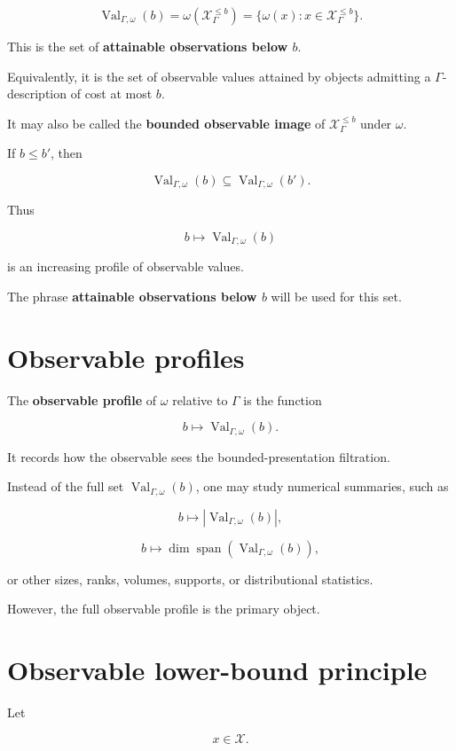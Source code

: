 \documentclass[11pt]{article}
\begin{document}
\[
\operatorname{Val}_{\Gamma,\omega}(b)=\omega(\mathcal X_\Gamma^{\leq b})=\{\omega(x):x\in\mathcal X_\Gamma^{\leq b}\}.
\]

This is the set of \textbf{attainable observations below \(b\)}.

Equivalently, it is the set of observable values attained by objects admitting a \(\Gamma\)-description of cost at most \(b\).

It may also be called the \textbf{bounded observable image} of \(\mathcal X_\Gamma^{\leq b}\) under \(\omega\).

If \(b\leq b'\), then

\[
\operatorname{Val}_{\Gamma,\omega}(b)
\subseteq
\operatorname{Val}_{\Gamma,\omega}(b').
\]

Thus

\[
b\mapsto \operatorname{Val}_{\Gamma,\omega}(b)
\]

is an increasing profile of observable values.

The phrase \textbf{attainable observations below \(b\)} will be used for this set.


\section{Observable profiles}

The \textbf{observable profile} of \(\omega\) relative to \(\Gamma\) is the function

\[
b\longmapsto \operatorname{Val}_{\Gamma,\omega}(b).
\]

It records how the observable sees the bounded-presentation filtration.

Instead of the full set \(\operatorname{Val}_{\Gamma,\omega}(b)\), one may study numerical summaries, such as

\[
b\mapsto |\operatorname{Val}_{\Gamma,\omega}(b)|,
\]

\[
b\mapsto \dim \operatorname{span}(\operatorname{Val}_{\Gamma,\omega}(b)),
\]

or other sizes, ranks, volumes, supports, or distributional statistics.

However, the full observable profile is the primary object.


\section{Observable lower-bound principle}

Let

\[
x\in\mathcal X.
\]
\end{document}
